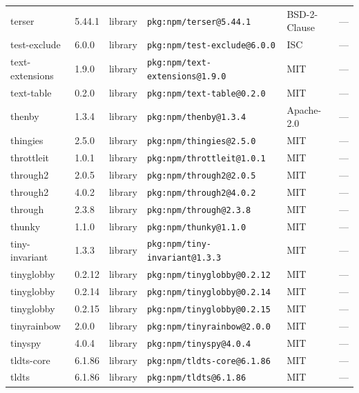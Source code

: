 \documentclass[11pt,a4paper]{article}
\begin{document}
\begin{longtable}{|p{4cm}|p{2cm}|p{1.6cm}|p{5cm}|p{1.5cm}|p{3.5cm}|}
\raggedright terser & 5.44.1 & library & \small\texttt{pkg:npm/terser@5.44.1} & BSD-2-Clause & \small — \\
\raggedright test-exclude & 6.0.0 & library & \small\texttt{pkg:npm/test-exclude@6.0.0} & ISC & \small — \\
\raggedright text-extensions & 1.9.0 & library & \small\texttt{pkg:npm/text-extensions@1.9.0} & MIT & \small — \\
\raggedright text-table & 0.2.0 & library & \small\texttt{pkg:npm/text-table@0.2.0} & MIT & \small — \\
\raggedright thenby & 1.3.4 & library & \small\texttt{pkg:npm/thenby@1.3.4} & Apache-2.0 & \small — \\
\raggedright thingies & 2.5.0 & library & \small\texttt{pkg:npm/thingies@2.5.0} & MIT & \small — \\
\raggedright throttleit & 1.0.1 & library & \small\texttt{pkg:npm/throttleit@1.0.1} & MIT & \small — \\
\raggedright through2 & 2.0.5 & library & \small\texttt{pkg:npm/through2@2.0.5} & MIT & \small — \\
\raggedright through2 & 4.0.2 & library & \small\texttt{pkg:npm/through2@4.0.2} & MIT & \small — \\
\raggedright through & 2.3.8 & library & \small\texttt{pkg:npm/through@2.3.8} & MIT & \small — \\
\raggedright thunky & 1.1.0 & library & \small\texttt{pkg:npm/thunky@1.1.0} & MIT & \small — \\
\raggedright tiny-invariant & 1.3.3 & library & \small\texttt{pkg:npm/tiny-invariant@1.3.3} & MIT & \small — \\
\raggedright tinyglobby & 0.2.12 & library & \small\texttt{pkg:npm/tinyglobby@0.2.12} & MIT & \small — \\
\raggedright tinyglobby & 0.2.14 & library & \small\texttt{pkg:npm/tinyglobby@0.2.14} & MIT & \small — \\
\raggedright tinyglobby & 0.2.15 & library & \small\texttt{pkg:npm/tinyglobby@0.2.15} & MIT & \small — \\
\raggedright tinyrainbow & 2.0.0 & library & \small\texttt{pkg:npm/tinyrainbow@2.0.0} & MIT & \small — \\
\raggedright tinyspy & 4.0.4 & library & \small\texttt{pkg:npm/tinyspy@4.0.4} & MIT & \small — \\
\raggedright tldts-core & 6.1.86 & library & \small\texttt{pkg:npm/tldts-core@6.1.86} & MIT & \small — \\
\raggedright tldts & 6.1.86 & library & \small\texttt{pkg:npm/tldts@6.1.86} & MIT & \small — \\

\end{longtable}
\end{document}
